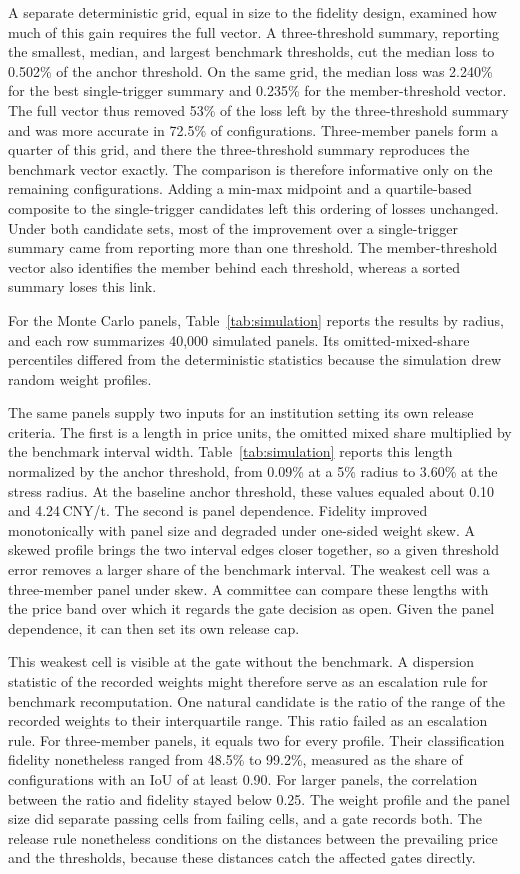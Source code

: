 \documentclass[5p,times,authoryear]{elsarticle}
\theoremstyle{plain}
\begin{document}
A separate deterministic grid, equal in size to the fidelity design, examined how much of this gain requires the full vector. A three-threshold summary, reporting the smallest, median, and largest benchmark thresholds, cut the median loss to 0.502\% of the anchor threshold. On the same grid, the median loss was 2.240\% for the best single-trigger summary and 0.235\% for the member-threshold vector. The full vector thus removed 53\% of the loss left by the three-threshold summary and was more accurate in 72.5\% of configurations. Three-member panels form a quarter of this grid, and there the three-threshold summary reproduces the benchmark vector exactly. The comparison is therefore informative only on the remaining configurations. Adding a min-max midpoint and a quartile-based composite to the single-trigger candidates left this ordering of losses unchanged. Under both candidate sets, most of the improvement over a single-trigger summary came from reporting more than one threshold. The member-threshold vector also identifies the member behind each threshold, whereas a sorted summary loses this link.

For the Monte Carlo panels, Table~\ref{tab:simulation} reports the results by radius, and each row summarizes 40,000 simulated panels. Its omitted-mixed-share percentiles differed from the deterministic statistics because the simulation drew random weight profiles.

The same panels supply two inputs for an institution setting its own release criteria. The first is a length in price units, the omitted mixed share multiplied by the benchmark interval width. Table~\ref{tab:simulation} reports this length normalized by the anchor threshold, from 0.09\% at a 5\% radius to 3.60\% at the stress radius. At the baseline anchor threshold, these values equaled about 0.10 and 4.24\,CNY/t. The second is panel dependence. Fidelity improved monotonically with panel size and degraded under one-sided weight skew. A skewed profile brings the two interval edges closer together, so a given threshold error removes a larger share of the benchmark interval. The weakest cell was a three-member panel under skew. A committee can compare these lengths with the price band over which it regards the gate decision as open. Given the panel dependence, it can then set its own release cap.

This weakest cell is visible at the gate without the benchmark. A dispersion statistic of the recorded weights might therefore serve as an escalation rule for benchmark recomputation. One natural candidate is the ratio of the range of the recorded weights to their interquartile range. This ratio failed as an escalation rule. For three-member panels, it equals two for every profile. Their classification fidelity nonetheless ranged from 48.5\% to 99.2\%, measured as the share of configurations with an IoU of at least 0.90. For larger panels, the correlation between the ratio and fidelity stayed below 0.25. The weight profile and the panel size did separate passing cells from failing cells, and a gate records both. The release rule nonetheless conditions on the distances between the prevailing price and the thresholds, because these distances catch the affected gates directly.
\end{document}
